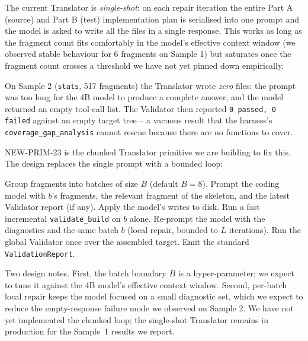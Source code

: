 The current Translator is \emph{single-shot}: on each repair iteration
the entire Part A (source) and Part B (test) implementation plan is
serialised into one prompt and the model is asked to write all the
files in a single response. This works as long as the fragment count
fits comfortably in the model's effective context window (we observed
stable behaviour for 6 fragments on Sample 1) but saturates once the
fragment count crosses a threshold we have not yet pinned down
empirically.

On Sample 2 (\texttt{stats}, 517 fragments) the Translator wrote
\emph{zero} files: the prompt was too long for the 4B model to produce
a complete answer, and the model returned an empty tool-call list. The
Validator then reported \texttt{0 passed, 0 failed} against an empty
target tree -- a vacuous result that the harness's
\texttt{coverage\_gap\_analysis} cannot rescue because there are no
functions to cover.

NEW-PRIM-23 is the chunked Translator primitive we are building to fix
this. The design replaces the single prompt with a bounded loop:

\begin{algorithm}[ht]
\caption{Chunked Translator (NEW-PRIM-23, design)}
\label{alg:chunked}
\begin{algorithmic}[1]
\State Group fragments into batches of size $B$ (default $B=8$).
  \State Prompt the coding model with $b$'s fragments, the relevant
  fragment of the skeleton, and the latest Validator report (if any).
  \State Apply the model's writes to disk.
  \State Run a fast incremental \texttt{validate\_build} on $b$ alone.
    \State Re-prompt the model with the diagnostics and the same batch
    $b$ (local repair, bounded to $L$ iterations).
  \EndIf
\EndFor
\State Run the global Validator once over the assembled target.
\State Emit the standard \texttt{ValidationReport}.
\end{algorithmic}
\end{algorithm}

\noindent
Two design notes. First, the batch boundary $B$ is a hyper-parameter;
we expect to tune it against the 4B model's effective context window.
Second, per-batch local repair keeps the model focused on a small
diagnostic set, which we expect to reduce the empty-response failure
mode we observed on Sample 2. We have not yet implemented the chunked
loop; the single-shot Translator remains in production for the Sample~1
results we report.
